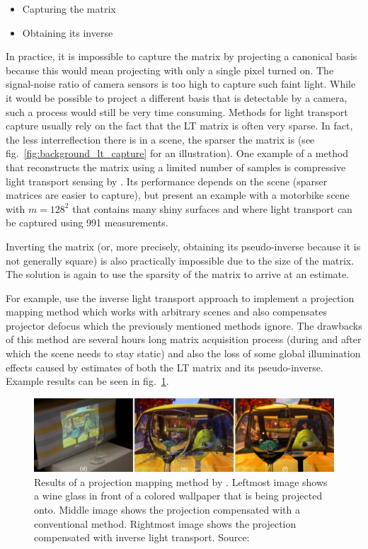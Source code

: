 \begin{itemize}
    \item Capturing the matrix
    \item Obtaining its inverse
\end{itemize}

In practice, it is impossible to capture the matrix by projecting a canonical basis because this would mean projecting with only a single pixel turned on. The signal-noise ratio of camera sensors is too high to capture such faint light. While it would be possible to project a different basis that is detectable by a camera, such a process would still be very time consuming. Methods for light transport capture usually rely on the fact that the LT matrix is often very sparse. In fact, the less interreflection there is in a scene, the sparser the matrix is (see fig.~\ref{fig:background_lt_capture} for an illustration). One example of a method that reconstructs the matrix using a limited number of samples is compressive light transport sensing by \citet{Peers2009}. Its performance depends on the scene (sparser matrices are easier to capture), but \citet{Peers2009} present an example with a motorbike scene with \(m = 128^2\) that contains many shiny surfaces and where light transport can be captured using 991 measurements.

Inverting the matrix (or, more precisely, obtaining its pseudo-inverse because it is not generally square) is also practically impossible due to the size of the matrix. The solution is again to use the sparsity of the matrix to arrive at an estimate.

For example, \citet{Wetzstein2007} use the inverse light transport approach to implement a projection mapping method which works with arbitrary scenes and also compensates projector defocus which the previously mentioned methods ignore. The drawbacks of this method are several hours long matrix acquisition process (during and after which the scene needs to stay static) and also the loss of some global illumination effects caused by estimates of both the LT matrix and its pseudo-inverse. Example results can be seen in fig.~\ref{fig:background_wetzstein_result}.

\begin{figure}
    \centering
    \includegraphics[width=\textwidth]{images/02-wetzstein_result_crop.jpg}
    \caption{Results of a projection mapping method by \citet{Wetzstein2007}. Leftmost image shows a wine glass in front of a colored wallpaper that is being projected onto. Middle image shows the projection compensated with a conventional method. Rightmost image shows the projection compensated with inverse light transport. Source: \citet{Wetzstein2007}}
    \label{fig:background_wetzstein_result}
\end{figure}

